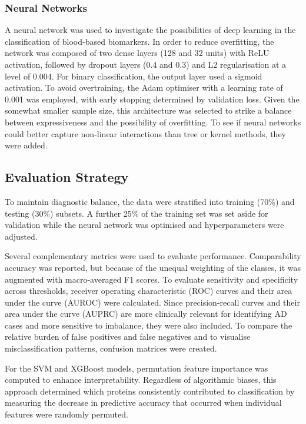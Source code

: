 \documentclass[a4paper,12pt]{article}
\begin{document}
\subsubsection{Neural Networks}
A neural network was used to investigate the possibilities of deep learning in the classification of blood-based biomarkers.  In order to reduce overfitting, the network was composed of two dense layers (128 and 32 units) with ReLU activation, followed by dropout layers (0.4 and 0.3) and L2 regularisation at a level of 0.004.  For binary classification, the output layer used a sigmoid activation.  To avoid overtraining, the Adam optimiser with a learning rate of 0.001 was employed, with early stopping determined by validation loss.  Given the somewhat smaller sample size, this architecture was selected to strike a balance between expressiveness and the possibility of overfitting.  To see if neural networks could better capture non-linear interactions than tree or kernel methods, they were added. 

\subsection{Evaluation Strategy}
To maintain diagnostic balance, the data were stratified into training (70\%) and testing (30\%) subsets.  A further 25\% of the training set was set aside for validation while the neural network was optimised and hyperparameters were adjusted. 

Several complementary metrics were used to evaluate performance.  Comparability accuracy was reported, but because of the unequal weighting of the classes, it was augmented with macro-averaged F1 scores.  To evaluate sensitivity and specificity across thresholds, receiver operating characteristic (ROC) curves and their area under the curve (AUROC) were calculated.  Since precision-recall curves and their area under the curve (AUPRC) are more clinically relevant for identifying AD cases and more sensitive to imbalance, they were also included.  To compare the relative burden of false positives and false negatives and to visualise misclassification patterns, confusion matrices were created.

For the SVM and XGBoost models, permutation feature importance was computed to enhance interpretability.  Regardless of algorithmic biases, this approach determined which proteins consistently contributed to classification by measuring the decrease in predictive accuracy that occurred when individual features were randomly permuted.
\end{document}
